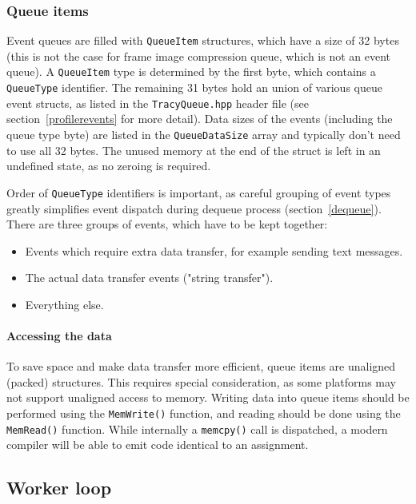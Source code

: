 \documentclass[hidelinks,titlepage,a4paper]{article}
\begin{document}
\subsubsection{Queue items}
\label{queueitems}

Event queues are filled with \texttt{QueueItem} structures, which have a size of 32 bytes (this is not the case for frame image compression queue, which is not an event queue). A \texttt{QueueItem} type is determined by the first byte, which contains a \texttt{QueueType} identifier. The remaining 31 bytes hold an union of various queue event structs, as listed in the \texttt{TracyQueue.hpp} header file (see section~\ref{profilerevents} for more detail). Data sizes of the events (including the queue type byte) are listed in the \texttt{QueueDataSize} array and typically don't need to use all 32 bytes. The unused memory at the end of the struct is left in an undefined state, as no zeroing is required.

Order of \texttt{QueueType} identifiers is important, as careful grouping of event types greatly simplifies event dispatch during dequeue process (section~\ref{dequeue}). There are three groups of events, which have to be kept together:

\begin{itemize}
\item Events which require extra data transfer, for example sending text messages.
\item The actual data transfer events ("string transfer").
\item Everything else.
\end{itemize}

\paragraph{Accessing the data}
\label{accessingdata}

To save space and make data transfer more efficient, queue items are unaligned (packed) structures. This requires special consideration, as some platforms may not support unaligned access to memory. Writing data into queue items should be performed using the \texttt{MemWrite()} function, and reading should be done using the \texttt{MemRead()} function. While internally a \texttt{memcpy()} call is dispatched, a modern compiler will be able to emit code identical to an assignment.

\subsection{Worker loop}
\label{workerloop}
\end{document}
